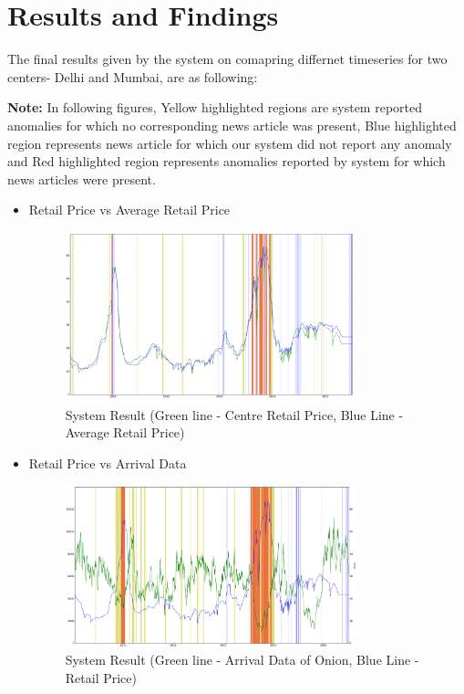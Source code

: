 \chapter{Results and Findings}

The final results given by the system on comapring differnet timeseries for two centers- Delhi and Mumbai, are as following:

\textbf{Note:} In following figures, Yellow highlighted regions are system reported anomalies for which no corresponding news article was present, Blue highlighted region represents news article for which our system did not report any anomaly and Red highlighted region represents anomalies reported by system for which news articles were present.

\begin{itemize}
 \item Retail Price vs Average Retail Price
			
			\begin{figure}[H]
		    	\centering
  		    	\includegraphics[width=0.8\textwidth]{graphs/MumbaiRetailVsAverageRetail.png}
		    	\caption{System Result (Green line - Centre Retail Price, Blue Line - Average Retail Price)}
		    	\label{fig:RvsR}
			\end{figure}
			
	
 \item Retail Price vs Arrival Data
			
			\begin{figure}[H]
		    	\centering
  		    	\includegraphics[width=0.8\textwidth]{graphs/mumbaiRvsA.png}
		    	\caption{System Result (Green line - Arrival Data of Onion, Blue Line - Retail Price)}
		    	\label{fig:RvsA}
			\end{figure}
			

\end{itemize}
